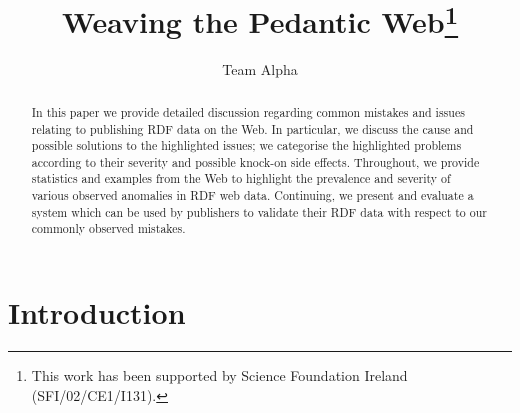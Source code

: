 \documentclass{llncs}
\begin{document}
\title{Weaving the Pedantic Web\thanks{This work has been supported by Science Foundation Ireland (SFI/02/CE1/I131).}}


\author {Team Alpha}

%
%





\maketitle

\begin{abstract}
In this paper we provide detailed discussion regarding common mistakes and issues relating to publishing RDF data on the Web.
In particular, we discuss the cause and possible solutions to the highlighted issues; we categorise the highlighted problems according to their severity and possible knock-on side effects.
Throughout, we provide statistics and examples from the Web to highlight the prevalence and severity of various observed anomalies in RDF web data.
Continuing, we present and evaluate a system which can be used by publishers to validate their RDF data with respect to our commonly observed mistakes.
\end{abstract}




\section{Introduction}\label{sec:intro}
\end{document}
